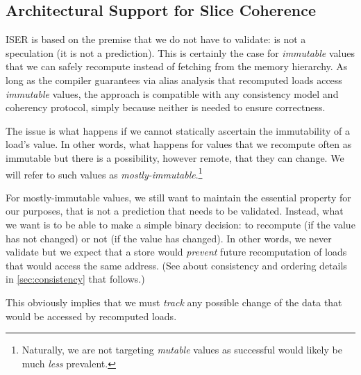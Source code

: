 
\subsection{Architectural Support for Slice Coherence}
ISER is based on the premise that we do not have to validate: {\recomp} is not a speculation (it is not a prediction). This is certainly the case for \emph{immutable} values that we can safely recompute instead of fetching from the memory hierarchy. As long as the compiler guarantees via alias analysis that recomputed loads access \emph{immutable} values, the approach is compatible with any consistency model and coherency protocol, simply because neither is needed to ensure correctness.

The issue is what happens if we cannot statically ascertain the immutability of a load's value. In other words, what happens for values that we recompute often as immutable but there is a possibility, however remote, that they can change. We will refer to such values as \emph{mostly-immutable}.\footnote{Naturally, we are not targeting \emph{mutable} values as successful {\recomp} would likely be much \emph{less} prevalent.}

For mostly-immutable values, we still want to maintain the essential property for our purposes, that {\recomp} is not a prediction that needs to be validated. Instead, what we want is to be able to make a simple binary decision: to recompute (if the value has not changed) or not (if the value has changed). In other words, we never validate {\recomp} but we expect that a store would \emph{prevent} future recomputation of loads that would access the same address. (See about consistency and ordering details in \autoref{sec:consistency} that follows.) 

This obviously implies that we must \emph{track} any possible change of the data that would be accessed by recomputed loads.

